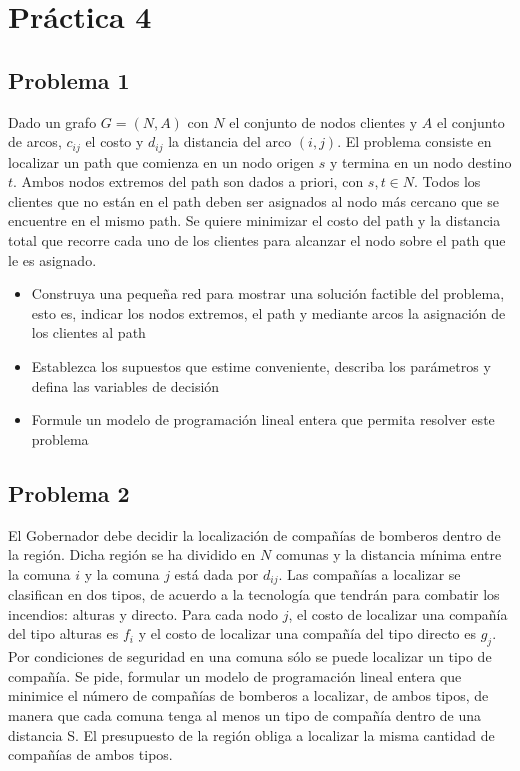 \documentclass[letterpaper]{article}
\begin{document}
\vspace*{0.1\baselineskip}
\section*{Práctica 4}
\subsection*{Problema 1}
Dado un grafo $G=(N,A)$ con $N$ el conjunto de nodos clientes y $A$ el conjunto de arcos, $c_{ij}$ el costo y $d_{ij}$ la distancia del arco $(i,j)$. El problema consiste en localizar un path que comienza en un nodo origen $s$ y termina en un nodo destino $t$. Ambos nodos extremos del path son dados a priori, con $s,t \in N$. Todos los clientes que no están en el path deben ser asignados al nodo más cercano que se encuentre en el mismo path. Se quiere minimizar el costo del path y la distancia total que recorre cada uno de los clientes para alcanzar el nodo sobre el path que le es asignado.
\begin{itemize}
\item Construya una pequeña red para mostrar una solución factible del problema, esto es, indicar los nodos extremos, el path y mediante arcos la asignación de los clientes al path
\item Establezca los supuestos que estime conveniente, describa los parámetros y defina las variables de decisión
\item Formule un modelo de programación lineal entera que permita resolver este problema
\end{itemize}

\subsection*{Problema 2}
El Gobernador debe decidir la localización de compañías de bomberos dentro de la región. Dicha región se ha dividido en $N$ comunas y la distancia mínima entre la comuna $i$ y la comuna $j$ está dada por $d_{ij}$. Las compañías a localizar se clasifican en dos tipos, de acuerdo a la tecnología que tendrán para combatir los incendios: alturas y directo. Para cada nodo $j$, el costo de localizar una compañía del tipo alturas es $f_{i}$ y el costo de localizar una compañía del tipo directo es $g_{j}$. Por condiciones de seguridad en una comuna sólo se puede localizar un tipo de compañía. Se pide, formular un modelo de programación lineal entera que minimice el número de compañías de bomberos a localizar, de ambos tipos, de manera que cada comuna tenga al menos un tipo de compañía dentro de una distancia S. El presupuesto de la región obliga a localizar la misma cantidad de compañías de ambos tipos. 
\end{document}
